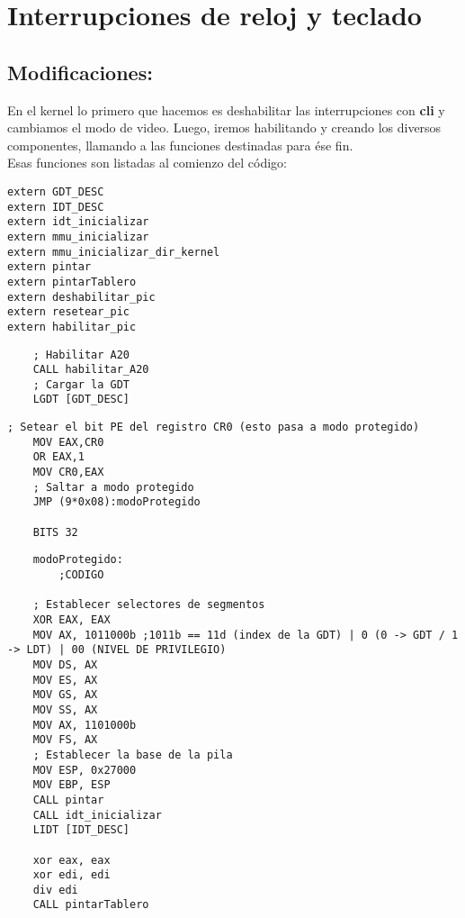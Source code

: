 
\section{Interrupciones de reloj y teclado}
\subsection{Modificaciones:}

En el kernel lo primero que hacemos es deshabilitar las interrupciones con \textbf{cli} y cambiamos el modo de video. 
Luego, iremos habilitando y creando los diversos componentes, llamando a las funciones destinadas para \'ese fin.
\\
Esas funciones son listadas al comienzo del c\'odigo:

\begin{codesnippet}
\begin{verbatim}
extern GDT_DESC
extern IDT_DESC 
extern idt_inicializar
extern mmu_inicializar
extern mmu_inicializar_dir_kernel
extern pintar
extern pintarTablero
extern deshabilitar_pic
extern resetear_pic
extern habilitar_pic
\end{verbatim}
\end{codesnippet}

\begin{codesnippet}
\begin{verbatim}
    ; Habilitar A20
    CALL habilitar_A20
    ; Cargar la GDT
    LGDT [GDT_DESC]
\end{verbatim}
\end{codesnippet}

\begin{codesnippet}
\begin{verbatim}
; Setear el bit PE del registro CR0 (esto pasa a modo protegido)
    MOV EAX,CR0
    OR EAX,1
    MOV CR0,EAX
    ; Saltar a modo protegido
    JMP (9*0x08):modoProtegido

    BITS 32
\end{verbatim}
\end{codesnippet}

\begin{codesnippet}
\begin{verbatim}
    modoProtegido:
        ;CODIGO
        
    ; Establecer selectores de segmentos
    XOR EAX, EAX
    MOV AX, 1011000b ;1011b == 11d (index de la GDT) | 0 (0 -> GDT / 1 -> LDT) | 00 (NIVEL DE PRIVILEGIO)
    MOV DS, AX
    MOV ES, AX
    MOV GS, AX
    MOV SS, AX
    MOV AX, 1101000b
    MOV FS, AX
    ; Establecer la base de la pila
    MOV ESP, 0x27000
    MOV EBP, ESP
    CALL pintar
    CALL idt_inicializar
	LIDT [IDT_DESC]

    xor eax, eax
    xor edi, edi
    div edi	
	CALL pintarTablero
\end{verbatim}
\end{codesnippet}

